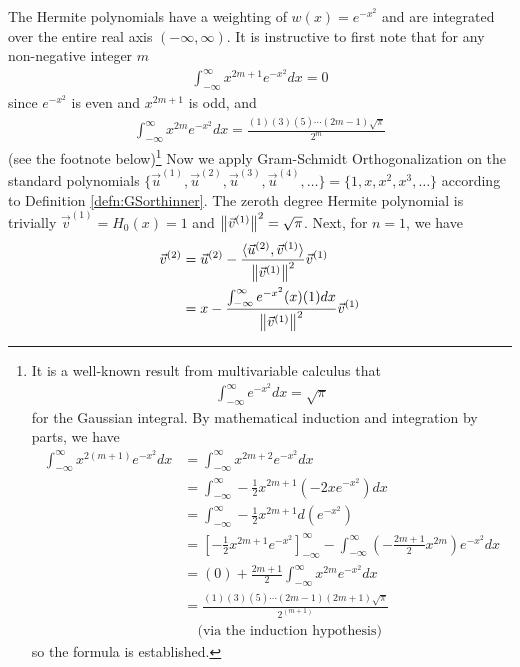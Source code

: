 \begin{solution}
The Hermite polynomials have a weighting of $w(x) = e^{-x^2}$ and are integrated over the entire real axis $(-\infty, \infty)$. It is instructive to first note that for any non-negative integer $m$
\begin{align*}
\int_{-\infty}^{\infty} x^{2m+1}e^{-x^2} dx = 0
\end{align*}
since $e^{-x^2}$ is even and $x^{2m+1}$ is odd, and
\begin{align*}
\int_{-\infty}^{\infty} x^{2m}e^{-x^2} dx = \frac{(1)(3)(5)\cdots(2m-1)\sqrt{\pi}}{2^m}
\end{align*}
(see the footnote below)\footnote{It is a well-known result from multivariable calculus that
\begin{align*}
\int_{-\infty}^{\infty} e^{-x^2} dx = \sqrt{\pi}
\end{align*}
for the Gaussian integral. By mathematical induction and integration by parts, we have
\begin{align*}
\int_{-\infty}^{\infty} x^{2(m+1)}e^{-x^2} dx &= \int_{-\infty}^{\infty} x^{2m+2}e^{-x^2} dx \\
&= \int_{-\infty}^{\infty} -\frac{1}{2}x^{2m+1} (-2xe^{-x^2}) dx \\
&= \int_{-\infty}^{\infty} -\frac{1}{2}x^{2m+1} d(e^{-x^2}) \\
&= [-\frac{1}{2}x^{2m+1}e^{-x^2}]_{-\infty}^{\infty} - \int_{-\infty}^{\infty} (-\frac{2m+1}{2}x^{2m})e^{-x^2} dx \\
&= (0) + \frac{2m+1}{2} \int_{-\infty}^{\infty} x^{2m}e^{-x^2} dx \\
&= \frac{(1)(3)(5)\cdots(2m-1)(2m+1)\sqrt{\pi}}{2^{(m+1)}} \\
&\quad \text{(via the induction hypothesis)}
\end{align*}
so the formula is established.} 
Now we apply Gram-Schmidt Orthogonalization on the standard polynomials $\{\vec{u}^{(1)}, \vec{u}^{(2)}, \vec{u}^{(3)}, \vec{u}^{(4)}, \ldots\} = \{1, x, x^2, x^3, \ldots\}$ according to Definition \ref{defn:GSorthinner}. The zeroth degree Hermite polynomial is trivially $\vec{v}^{(1)} = H_0(x) = 1$ and $\norm{\vec{v}^{(1)}}^2 = \sqrt{\pi}$. Next, for $n=1$, we have
\begin{align*}
\vec{v}^{(2)} &= \vec{u}^{(2)} - \frac{\langle \vec{u}^{(2)}, \vec{v}^{(1)}\rangle}{\norm{\vec{v}^{(1)}}^2} \vec{v}^{(1)} \\
&= x - \frac{\int_{-\infty}^{\infty} e^{-x^2}(x)(1) dx}{\norm{\vec{v}^{(1)}}^2} \vec{v}^{(1)} \\

\end{align*}
\end{solution}
